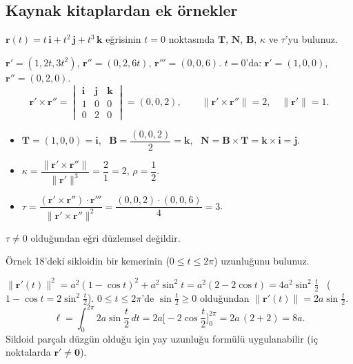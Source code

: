 \subsection{Kaynak kitaplardan ek örnekler}

\begin{soru}
$\mathbf r(t)=t\,\mathbf i+t^2\,\mathbf j+t^3\,\mathbf k$ eğrisinin $t=0$ noktasında $\mathbf T$, $\mathbf N$, $\mathbf B$, $\kappa$ ve $\tau$'yu bulunuz.
\end{soru}
\begin{cevap}
$\mathbf r'=(1,2t,3t^2)$, $\mathbf r''=(0,2,6t)$, $\mathbf r'''=(0,0,6)$. $t=0$'da: $\mathbf r'=(1,0,0)$, $\mathbf r''=(0,2,0)$.
\[ \mathbf r'\times\mathbf r''=\begin{vmatrix}\mathbf i&\mathbf j&\mathbf k\\1&0&0\\0&2&0\end{vmatrix}=(0,0,2),\qquad \|\mathbf r'\times\mathbf r''\|=2,\quad\|\mathbf r'\|=1 . \]
\begin{itemize}
\item $\mathbf T=(1,0,0)=\mathbf i$, \ $\mathbf B=\dfrac{(0,0,2)}{2}=\mathbf k$, \ $\mathbf N=\mathbf B\times\mathbf T=\mathbf k\times\mathbf i=\mathbf j$.
\item $\kappa=\dfrac{\|\mathbf r'\times\mathbf r''\|}{\|\mathbf r'\|^3}=\dfrac21=2$, \quad $\rho=\dfrac12$.
\item $\tau=\dfrac{(\mathbf r'\times\mathbf r'')\cdot\mathbf r'''}{\|\mathbf r'\times\mathbf r''\|^2}=\dfrac{(0,0,2)\cdot(0,0,6)}{4}=3$.
\end{itemize}
$\tau\neq0$ olduğundan eğri düzlemsel değildir.
\end{cevap}

\begin{soru}
Örnek 18'deki sikloidin bir kemerinin ($0\le t\le2\pi$) uzunluğunu bulunuz.
\end{soru}
\begin{cevap}
$\|\mathbf r'(t)\|^2=a^2(1-\cos t)^2+a^2\sin^2t=a^2(2-2\cos t)=4a^2\sin^2\frac t2$ \ ($1-\cos t=2\sin^2\frac t2$).
$0\le t\le2\pi$'de $\sin\frac t2\ge0$ olduğundan $\|\mathbf r'(t)\|=2a\sin\frac t2$.
\[ \ell=\int_0^{2\pi}2a\sin\frac t2\,dt=2a\Big[-2\cos\frac t2\Big]_0^{2\pi}=2a\,(2+2)=8a . \]
Sikloid parçalı düzgün olduğu için yay uzunluğu formülü uygulanabilir (iç noktalarda $\mathbf r'\neq\mathbf 0$).
\end{cevap}

